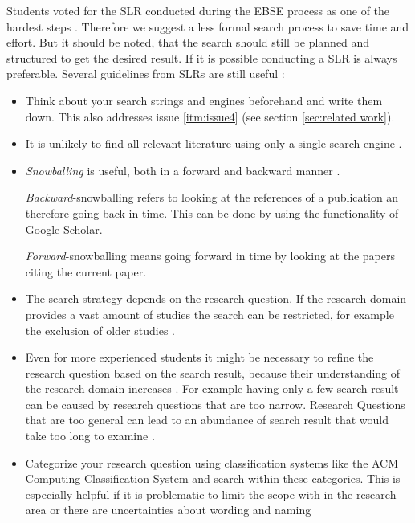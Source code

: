 Students voted for the SLR conducted during the EBSE process as one of the hardest steps \cite{keele2007}. Therefore we suggest a less formal search process to save time and effort. But it should be noted, that the search should still be planned and structured to get the desired result. If it is possible conducting a SLR is always preferable.
\newline
\newline
Several guidelines from SLRs are still useful :
\begin{itemize}
\item Think about your search strings and engines beforehand and write them down. This also addresses issue \ref{itm:issue4} (see section \ref{sec:related work}).
\item It is unlikely to find all relevant literature using only a single search engine \cite{Brereton2007}. 
\item \emph{Snowballing} is useful, both in a forward and backward manner \cite{Wohlin2014}. 

\emph{Backward}-snowballing refers to looking at the references of a publication an therefore going back in time. This can be done by using the  functionality of Google Scholar.

\emph{Forward}-snowballing means going forward in time by looking at the papers citing the current paper.
\item The search strategy depends on the research question. If the research domain provides a vast amount of studies the search can  be restricted, for example the exclusion of older studies \cite{Brereton2007}.
\item Even for more experienced students it might be necessary to refine the research question based on the search result, because their understanding of the research domain increases \cite{Brereton2007}. For example having only a few search result can be caused by research questions that are too narrow. Research Questions that are too general can lead to an abundance of search result that would take too long to examine . 
\item Categorize your research question using classification systems like the ACM Computing Classification System and search within these categories. This is especially helpful if it is problematic to limit the scope with in the research area or there are uncertainties about wording and naming
\end{itemize} 


